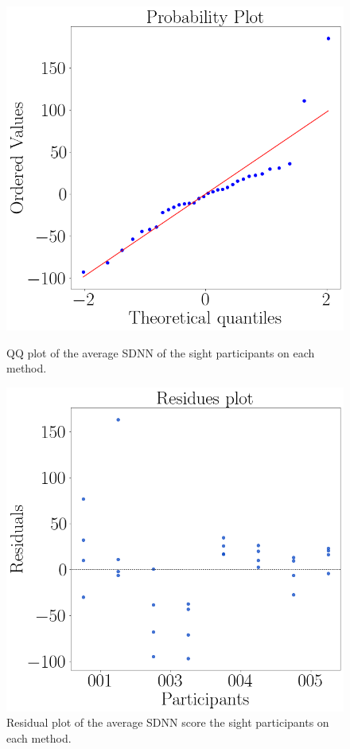 \begin{figure}[!htb]
    \centering
    \begin{minipage}{0.45\textwidth}
        \centering
        \includegraphics[width = 0.8\linewidth]{Resultados/ECG/Figuras/png/qqplot_sdnn_two_way_sight.png}
        \caption{QQ plot of the average SDNN of the sight participants on each method.}
        \label{fig:qqplot_sdnn_two_way_sight}
    \end{minipage}
    \begin{minipage}{0.45\textwidth}
        \centering
        \includegraphics[width = 0.8\linewidth]{Resultados/ECG/Figuras/png/residplot_sdnn_two_way_sight.png}
        \caption{Residual plot of the average SDNN score the sight participants on each method.}
        \label{fig:residplot_sdnn_two_way_sight}
    \end{minipage}
\end{figure}


